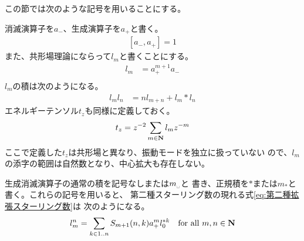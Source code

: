 	この節では次のような記号を用いることにする。
	\begin{description}\setlength{\itemsep}{-1mm} %
		\item[昇降演算子] 消滅演算子を$a_-$、生成演算子を$a_+$と書く。
		\begin{equation*}\begin{split} %
			[a_-,a_+] = 1
		\end{split}\end{equation*} %
		また、共形場理論にならって$l_m$と書くことにする。
		\begin{equation*}\begin{split} %
			l_m &= a_+^{m+1}a_- \\
		\end{split}\end{equation*} %
		$l_m$の積は次のようになる。
		\begin{equation*}\begin{split} %
			l_ml_n &= nl_{m+n} + l_m*l_n
		\end{split}\end{equation*} %
		エネルギーテンソル$t_z$も同様に定義しておく。
		\begin{equation*}\begin{split} %
			t_z &= z^{-2}\sum_{m\in\sizen}l_mz^{-m} \\
		\end{split}\end{equation*} %
		ここで定義した$t_z$は共形場と異なり、振動モードを独立に扱っていない
		ので、$l_m$の添字の範囲は自然数となり、中心拡大も存在しない。
		\item[正規積] 生成消滅演算子の通常の積を記号なしまたは$m_\myspace$と
		書き、正規積を$*$または$m_*$と書く。これらの記号を用いると、
		第二種スターリング数の現れる式\ref{eq:第二種拡張スターリング数}は
		次のようになる。
		\begin{equation*}\begin{split} %
			l_m^n = \sum_{k\in1..n} S_{m+1}(n,k) a_+^ml_0^{*k}
			\quad\text{for all }m,n\in\sizen
		\end{split}\end{equation*} %
	\end{description} %
